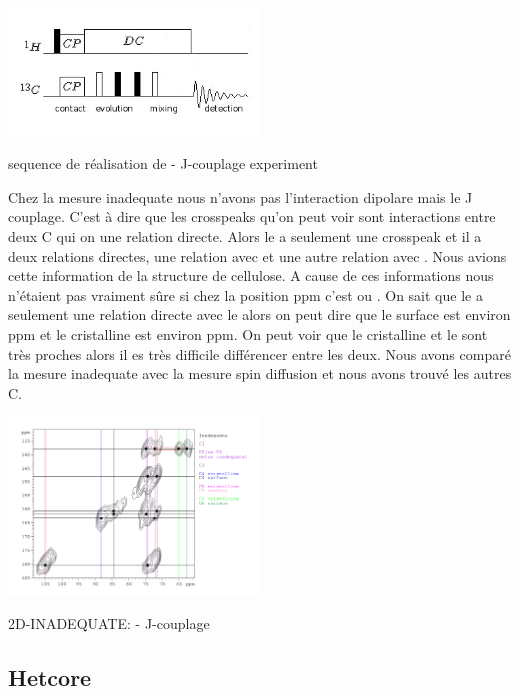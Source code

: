 \documentclass[a4paper,12pt]{scrartcl}
\begin{document}
{\begin{figurehere}
    \center
     \includegraphics[width=0.5\textwidth]{bilder/PDSD4.png}
     \caption{sequence de réalisation de  -  J-couplage experiment}
    \end{figurehere}
Chez la mesure inadequate nous n’avons pas l’interaction dipolare mais le J couplage. C’est à dire que les crosspeaks qu’on peut voir sont interactions entre deux C qui on une relation directe. Alors le  a seulement une crosspeak et il a deux relations directes, une relation avec  et une autre relation avec . Nous avions cette information de la structure de cellulose. A cause de ces informations nous n’étaient pas vraiment sûre si chez la position \unit [74,5] {ppm} c’est  ou . On sait que le  a seulement une relation directe avec le  alors on peut dire que le  surface est environ \unit [72,1] {ppm} et le  cristalline est environ \unit [74,9] {ppm}. On peut voir que le  cristalline et le  sont très proches alors il es très difficile différencer entre les deux. Nous avons comparé la mesure inadequate avec la mesure spin diffusion et nous avons trouvé les autres C. 
\begin{figurehere}
    \center
    \includegraphics[width=0.5\textwidth]{bilder/inad.png}
    \caption{2D-INADEQUATE:  -  J-couplage }
   \end{figurehere}
  \subsection{Hetcore}
 
}
\end{document}
